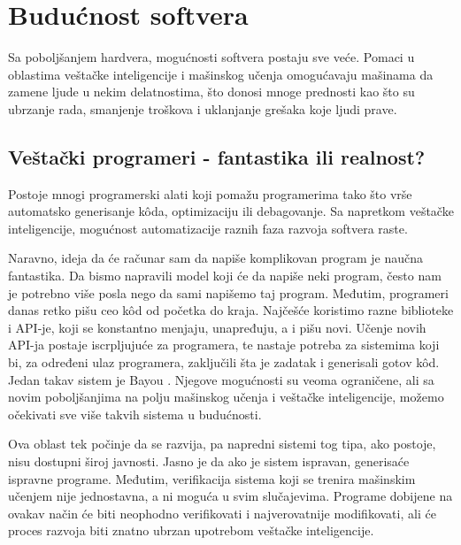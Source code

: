 \documentclass[a4paper]{article}
\begin{document}
\section{Budućnost softvera}
\label{sec:buducnost}

Sa poboljšanjem hardvera, mogućnosti softvera postaju sve veće. Pomaci u oblastima veštačke inteligencije i mašinskog učenja omogućavaju mašinama da zamene ljude u nekim delatnostima, što donosi mnoge prednosti kao što su ubrzanje rada, smanjenje troškova i uklanjanje grešaka koje ljudi prave.

\subsection{Veštački programeri - fantastika ili realnost?}
Postoje mnogi programerski alati koji pomažu programerima tako što vrše automatsko generisanje k\^{o}da, optimizaciju  ili debagovanje.
Sa napretkom veštačke inteligencije, mogućnost automatizacije raznih faza razvoja softvera raste.

Naravno, ideja da će računar sam da napiše komplikovan program je naučna fantastika. Da bismo napravili model koji će da napiše neki program, često nam je potrebno više posla nego da sami napišemo taj program. Međutim, programeri danas retko pišu ceo k\^{o}d od početka do kraja. Najčešće koristimo razne biblioteke i API-je, koji se konstantno menjaju, unapređuju, a i pišu novi. Učenje novih API-ja postaje iscrpljujuće za programera, te nastaje potreba za sistemima koji bi, za određeni ulaz programera, zaključili šta je zadatak i generisali gotov k\^{o}d. Jedan takav sistem je Bayou \cite{bayou}. Njegove mogućnosti su veoma ograničene, ali sa novim poboljšanjima na polju mašinskog učenja i veštačke inteligencije, možemo očekivati sve više takvih sistema u budućnosti.

Ova oblast tek počinje da se razvija, pa napredni sistemi tog tipa, ako postoje, nisu dostupni široj javnosti. Jasno je da ako je sistem ispravan, generisaće ispravne programe. Međutim, verifikacija sistema koji se trenira mašinskim učenjem nije jednostavna, a ni moguća u svim slučajevima. Programe dobijene na ovakav način će biti neophodno verifikovati i najverovatnije modifikovati, ali će proces razvoja biti znatno ubrzan upotrebom veštačke inteligencije. 
\end{document}
